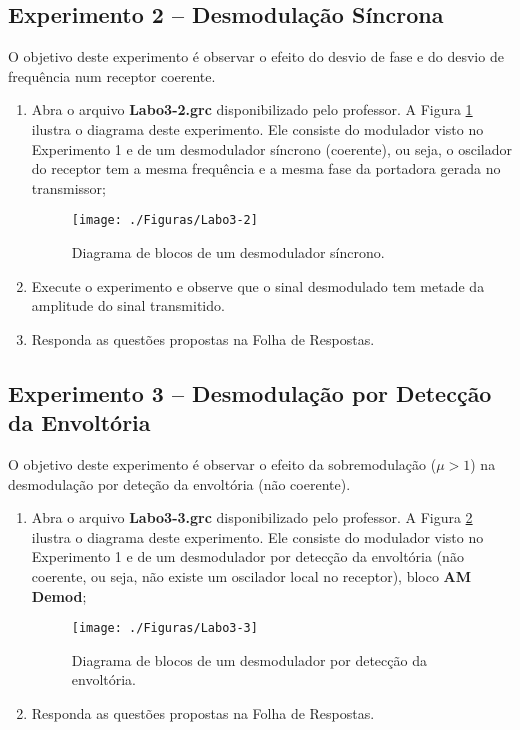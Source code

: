 \documentclass[12pt,addpoints]{exam}
\newcommand{\myscale}{0.4}
\begin{document}
\subsection{Experimento 2 -- Desmodulação Síncrona}

O objetivo deste experimento é observar o efeito do desvio de fase e do desvio de frequência num receptor coerente.

\begin{enumerate}
    \item  Abra o arquivo \textbf{Labo3-2.grc} disponibilizado pelo professor. A Figura \ref{fig:GRC_3-1b} ilustra o diagrama deste experimento. Ele consiste do modulador visto no Experimento 1 e de um desmodulador síncrono (coerente), ou seja, o oscilador do receptor tem a mesma frequência e a mesma fase da portadora gerada no transmissor; 
    \begin{figure}[htb]
        \centering
        \texttt{[image: ./Figuras/Labo3-2]}
        \caption{Diagrama de blocos de um desmodulador síncrono.} 
        \label{fig:GRC_3-1b}
    \end{figure}
  \item Execute o experimento e observe que o sinal desmodulado tem metade da amplitude do sinal transmitido.
  \item Responda as questões propostas na Folha de Respostas.
\end{enumerate}

\subsection{Experimento 3 -- Desmodulação por Detecção da Envoltória}

O objetivo deste experimento é observar o efeito da sobremodulação ($\mu > 1$) na desmodulação por deteção da envoltória (não coerente).

\begin{enumerate}
    \item  Abra o arquivo \textbf{Labo3-3.grc} disponibilizado pelo professor. A Figura \ref{fig:GRC_3-1c} ilustra o diagrama deste experimento. Ele consiste do modulador visto no Experimento 1 e de um desmodulador por detecção da envoltória (não coerente, ou seja, não existe um  oscilador local no receptor), bloco {\bf AM Demod};
    \begin{figure}[htb]
        \centering
        \texttt{[image: ./Figuras/Labo3-3]}
        \caption{Diagrama de blocos de um desmodulador por detecção da envoltória.} 
        \label{fig:GRC_3-1c}
    \end{figure}
  \item Responda as questões propostas na Folha de Respostas.
\end{enumerate}
\end{document}
